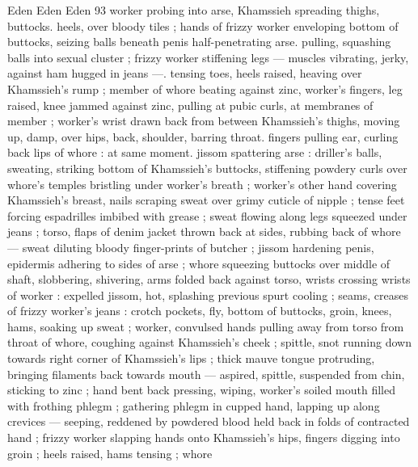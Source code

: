Eden Eden Eden 93
worker probing into arse, Khamssieh spreading thighs, buttocks.
heels, over bloody tiles ; hands of frizzy worker enveloping bottom
of buttocks, seizing balls beneath penis half-penetrating arse.
pulling, squashing balls into sexual cluster ; frizzy worker stiffening
legs — muscles vibrating, jerky, against ham hugged in jeans —.
tensing toes, heels raised, heaving over Khamssieh's rump ; member
of whore beating against zinc, worker's fingers, leg raised, knee
jammed against zinc, pulling at pubic curls, at membranes of
member ; worker's wrist drawn back from between Khamssieh's
thighs, moving up, damp, over hips, back, shoulder, barring throat.
fingers pulling ear, curling back lips of whore : at same moment.
jissom spattering arse : driller's balls, sweating, striking bottom of
Khamssieh’s buttocks, stiffening powdery curls over whore's temples
bristling under worker's breath ; worker's other hand covering
Khamssieh's breast, nails scraping sweat over grimy cuticle of nipple
; tense feet forcing espadrilles imbibed with grease ; sweat flowing
along legs squeezed under jeans ; torso, flaps of denim jacket
thrown back at sides, rubbing back of whore — sweat diluting
bloody finger-prints of butcher ; jissom hardening penis, epidermis
adhering to sides of arse ; whore squeezing buttocks over middle of
shaft, slobbering, shivering, arms folded back against torso, wrists
crossing wrists of worker : expelled jissom, hot, splashing previous
spurt cooling ; seams, creases of frizzy worker's jeans : crotch
pockets, fly, bottom of buttocks, groin, knees, hams, soaking up
sweat ; worker, convulsed hands pulling away from torso from throat
of whore, coughing against Khamssieh's cheek ; spittle, snot
running down towards right corner of Khamssieh’s lips ; thick mauve
tongue protruding, bringing filaments back towards mouth —
aspired, spittle, suspended from chin, sticking to zinc ; hand bent
back pressing, wiping, worker's soiled mouth filled with frothing
phlegm ; gathering phlegm in cupped hand, lapping up along
crevices — seeping, reddened by powdered blood held back in folds
of contracted hand ; frizzy worker slapping hands onto Khamssieh's
hips, fingers digging into groin ; heels raised, hams tensing ; whore

